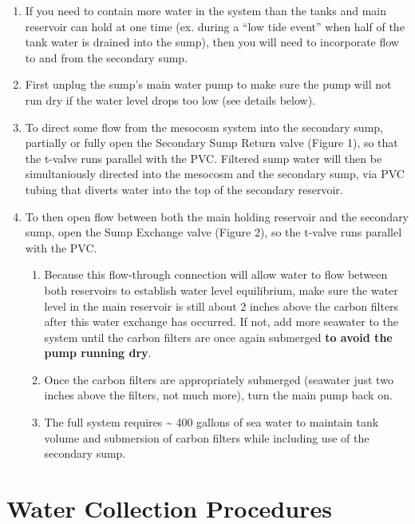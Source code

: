 \documentclass[]{book}
\providecommand{\tightlist}{%
  \setlength{\itemsep}{0pt}\setlength{\parskip}{0pt}}
\begin{document}
\begin{enumerate}
\def\labelenumi{\arabic{enumi}.}
\tightlist
\item
  If you need to contain more water in the system than the tanks and
  main reservoir can hold at one time (ex. during a ``low tide event''
  when half of the tank water is drained into the sump), then you will
  need to incorporate flow to and from the secondary sump.
\item
  First unplug the sump's main water pump to make sure the pump will not
  run dry if the water level drops too low (see details below).
\item
  To direct some flow from the mesocosm system into the secondary sump,
  partially or fully open the Secondary Sump Return valve (Figure 1), so
  that the t-valve runs parallel with the PVC. Filtered sump water will
  then be simultaniously directed into the mesocosm and the secondary
  sump, via PVC tubing that diverts water into the top of the secondary
  reservoir.
\item
  To then open flow between both the main holding reservoir and the
  secondary sump, open the Sump Exchange valve (Figure 2), so the
  t-valve runs parallel with the PVC.

  \begin{enumerate}
  \def\labelenumii{\arabic{enumii}.}
  \tightlist
  \item
    Because this flow-through connection will allow water to flow
    between both reservoirs to establish water level equilibrium, make
    sure the water level in the main reservoir is still about 2 inches
    above the carbon filters after this water exchange has occurred. If
    not, add more seawater to the system until the carbon filters are
    once again submerged \textbf{to avoid the pump running dry}.
  \item
    Once the carbon filters are appropriately submerged (seawater just
    two inches above the filters, not much more), turn the main pump
    back on.
  \item
    The full system requires \textasciitilde{} 400 gallons of sea water
    to maintain tank volume and submersion of carbon filters while
    including use of the secondary sump.
  \end{enumerate}
\end{enumerate}

\chapter{Water Collection Procedures}\label{water-collection-procedures}
\end{document}

